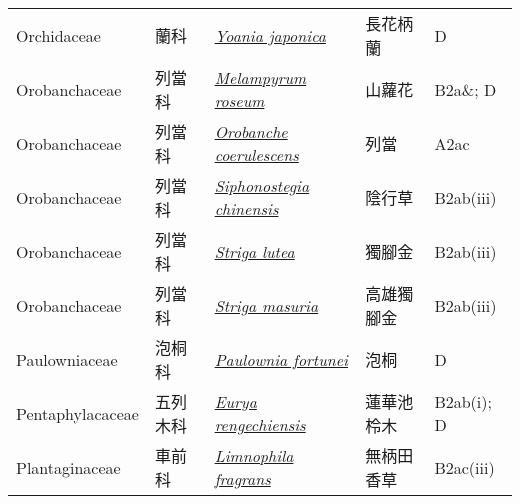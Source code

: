 {\begin{longtable}{L{2.5cm}L{2cm}L{5cm}L{2.5cm}L{3cm}}
    Orchidaceae & 蘭科 & \href{http://www.theplantlist.org/tpl1.1/search?q=Yoania+japonica}{\textit{Yoania japonica} } & 長花柄蘭 & D    \\
    Orobanchaceae & 列當科 & \href{http://www.theplantlist.org/tpl1.1/search?q=Melampyrum+roseum}{\textit{Melampyrum roseum} } & 山蘿花 & B2a\&; D    \\
    Orobanchaceae & 列當科 & \href{http://www.theplantlist.org/tpl1.1/search?q=Orobanche+coerulescens}{\textit{Orobanche coerulescens} } & 列當 & A2ac    \\
    Orobanchaceae & 列當科 & \href{http://www.theplantlist.org/tpl1.1/search?q=Siphonostegia+chinensis}{\textit{Siphonostegia chinensis} } & 陰行草 & B2ab(iii)    \\
    Orobanchaceae & 列當科 & \href{http://www.theplantlist.org/tpl1.1/search?q=Striga+lutea}{\textit{Striga lutea} } & 獨腳金 & B2ab(iii)    \\
    Orobanchaceae & 列當科 & \href{http://www.theplantlist.org/tpl1.1/search?q=Striga+masuria}{\textit{Striga masuria} } & 高雄獨腳金 & B2ab(iii)    \\
    Paulowniaceae & 泡桐科 & \href{http://www.theplantlist.org/tpl1.1/search?q=Paulownia+fortunei}{\textit{Paulownia fortunei} } & 泡桐 & D    \\
    Pentaphylacaceae & 五列木科 & \href{http://www.theplantlist.org/tpl1.1/search?q=Eurya+rengechiensis}{\textit{Eurya rengechiensis} } & 蓮華池柃木 & B2ab(i); D    \\
    Plantaginaceae & 車前科 & \href{http://www.theplantlist.org/tpl1.1/search?q=Limnophila+fragrans}{\textit{Limnophila fragrans} } & 無柄田香草 & B2ac(iii)    \\

\end{longtable}}
